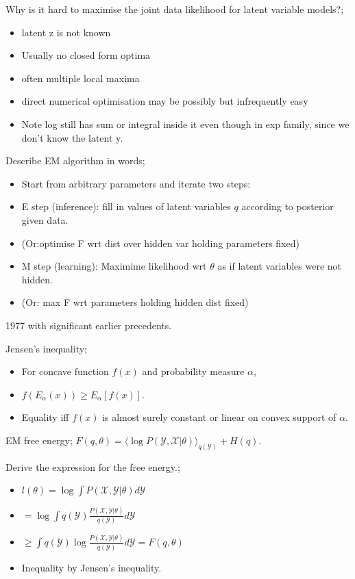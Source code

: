 \documentclass{article}
\begin{document}
Why is it hard to maximise the joint data likelihood for latent variable models?; \begin{itemize}
	\item latent z is not known
	\item Usually no closed form optima
	\item often multiple local maxima
	\item direct numerical optimisation may be possibly but infrequently easy
	\item Note log still has sum or integral inside it even though in exp family, since we don't know the latent y.
\end{itemize}

Describe EM algorithm in words; \begin{itemize}
	\item Start from arbitrary parameters and iterate two steps:
	\item E step (inference): fill in values of latent variables $q$ according to posterior given data.
	\item (Or:optimise F wrt dist over hidden var holding parameters fixed)
	\item M step (learning): Maximime likelihood wrt $\theta$ as if latent variables were not hidden.
	\item (Or: max F wrt parameters holding hidden dist fixed)
\end{itemize} 1977 with significant earlier precedents.

Jensen's inequality; \begin{itemize}
	\item For concave function $f(x)$ and probability measure $\alpha$,
	\item $f(E_{\alpha}(x))\geq E_\alpha[f(x)]$.
	\item Equality iff $f(x)$ is almost surely constant or linear on convex support of $\alpha$.
\end{itemize}

EM free energy; $F(q,\theta) = \langle \log P(\mathcal{Y, X}|\theta)\rangle_{q(\mathcal{Y})}+H(q)$.

Derive the expression for the free energy.; \begin{itemize}
	\item $l(\theta) = \log \int P(\mathcal{X, Y}|\theta)d\mathcal{Y}$ \item $= \log \int q(\mathcal{Y})\frac{P(\mathcal{X, Y}|\theta)}{q(\mathcal{Y})}d\mathcal{Y}$ \item $\geq \int q(\mathcal{Y})\log \frac{P(\mathcal{X, Y}|\theta)}{q(\mathcal{Y})}d\mathcal{Y} = F(q,\theta)$ \item Inequality by Jensen's inequality.
\end{itemize}
\end{document}
